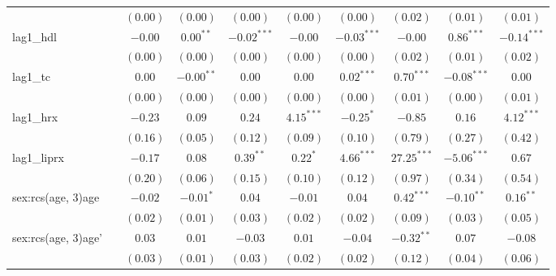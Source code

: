 \begin{tabular}{l c c c c c c c c c}
                    &              & $(0.00)$     & $(0.00)$      & $(0.00)$       & $(0.00)$       & $(0.00)$       & $(0.02)$       & $(0.01)$      & $(0.01)$      \\
lag1\_hdl           &              & $-0.00$      & $0.00^{**}$   & $-0.02^{***}$  & $-0.00$        & $-0.03^{***}$  & $-0.00$        & $0.86^{***}$  & $-0.14^{***}$ \\
                    &              & $(0.00)$     & $(0.00)$      & $(0.00)$       & $(0.00)$       & $(0.00)$       & $(0.02)$       & $(0.01)$      & $(0.02)$      \\
lag1\_tc            &              & $0.00$       & $-0.00^{**}$  & $0.00$         & $0.00$         & $0.02^{***}$   & $0.70^{***}$   & $-0.08^{***}$ & $0.00$        \\
                    &              & $(0.00)$     & $(0.00)$      & $(0.00)$       & $(0.00)$       & $(0.00)$       & $(0.01)$       & $(0.00)$      & $(0.01)$      \\
lag1\_hrx           &              & $-0.23$      & $0.09$        & $0.24$         & $4.15^{***}$   & $-0.25^{*}$    & $-0.85$        & $0.16$        & $4.12^{***}$  \\
                    &              & $(0.16)$     & $(0.05)$      & $(0.12)$       & $(0.09)$       & $(0.10)$       & $(0.79)$       & $(0.27)$      & $(0.42)$      \\
lag1\_liprx         &              & $-0.17$      & $0.08$        & $0.39^{**}$    & $0.22^{*}$     & $4.66^{***}$   & $27.25^{***}$  & $-5.06^{***}$ & $0.67$        \\
                    &              & $(0.20)$     & $(0.06)$      & $(0.15)$       & $(0.10)$       & $(0.12)$       & $(0.97)$       & $(0.34)$      & $(0.54)$      \\
sex:rcs(age, 3)age  &              & $-0.02$      & $-0.01^{*}$   & $0.04$         & $-0.01$        & $0.04$         & $0.42^{***}$   & $-0.10^{**}$  & $0.16^{**}$   \\
                    &              & $(0.02)$     & $(0.01)$      & $(0.03)$       & $(0.02)$       & $(0.02)$       & $(0.09)$       & $(0.03)$      & $(0.05)$      \\
sex:rcs(age, 3)age' &              & $0.03$       & $0.01$        & $-0.03$        & $0.01$         & $-0.04$        & $-0.32^{**}$   & $0.07$        & $-0.08$       \\
                    &              & $(0.03)$     & $(0.01)$      & $(0.03)$       & $(0.02)$       & $(0.02)$       & $(0.12)$       & $(0.04)$      & $(0.06)$      \\

\end{tabular}
